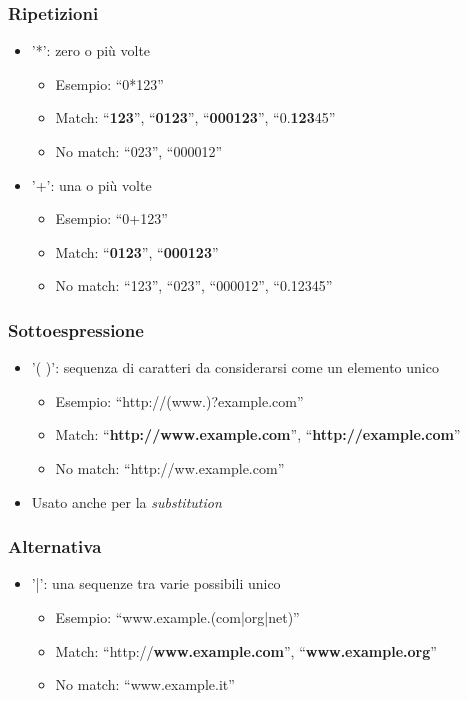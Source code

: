 \documentclass[xetex,table]{beamer}
\begin{document}
\begin{frame}
  \frametitle{Ripetizioni}
  \begin{itemize}
  \item '*': zero o più volte
    \begin{itemize}
    \item Esempio: ``0*123''
    \item Match: ``{\bf 123}'', ``{\bf 0123}'', ``{\bf 000123}'', ``0.{\bf 123}45''
    \item No match: ``023'', ``000012''
    \end{itemize}
  \item '+': una o più volte
    \begin{itemize}
    \item Esempio: ``0+123''
    \item Match: ``{\bf 0123}'', ``{\bf 000123}''
    \item No match: ``123'', ``023'', ``000012'', ``0.12345''
    \end{itemize}
  \end{itemize}
\end{frame}

\begin{frame}
  \frametitle{Sottoespressione}
  \begin{itemize}
  \item '( )': sequenza di caratteri da considerarsi come un elemento
    unico
    \begin{itemize}
    \item Esempio: ``http://(www.)?example.com''
    \item Match: ``{\bf http://www.example.com}'', ``{\bf http://example.com}''
    \item No match: ``http://ww.example.com''
    \end{itemize}
    \item Usato anche per la {\em substitution}
  \end{itemize}
\end{frame}

\begin{frame}
  \frametitle{Alternativa}
  \begin{itemize}
  \item '|': una sequenze tra varie possibili
    unico
    \begin{itemize}
    \item Esempio: ``www.example.(com|org|net)''
    \item Match: ``http://{\bf www.example.com}'', ``{\bf www.example.org}''
    \item No match: ``www.example.it''
    \end{itemize}
  \end{itemize}
\end{frame}
\end{document}

